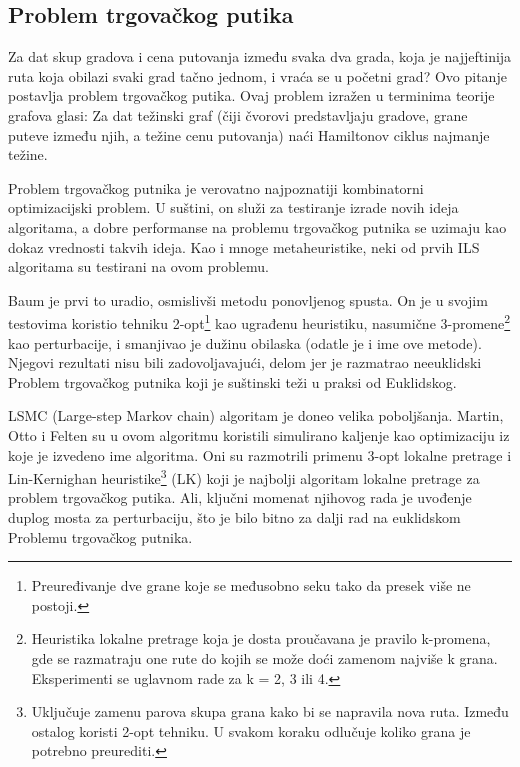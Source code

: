 \documentclass[a4paper]{article}
\begin{document}
\subsection{Problem trgovačkog putika}
Za dat skup gradova i cena putovanja između svaka dva grada, koja je najjeftinija ruta koja obilazi svaki grad tačno jednom, i vraća se u početni grad? Ovo pitanje postavlja problem trgovačkog putika. Ovaj problem izražen u terminima teorije grafova glasi: Za dat težinski graf (čiji čvorovi predstavljaju gradove, grane puteve između njih, a težine cenu putovanja) naći Hamiltonov ciklus najmanje težine.

Problem trgovačkog putnika je verovatno najpoznatiji kombinatorni optimizacijski problem. U suštini, on služi za testiranje izrade novih ideja algoritama, a dobre performanse na problemu trgovačkog putnika se uzimaju kao dokaz vrednosti takvih ideja. Kao i mnoge metaheuristike, neki od prvih ILS algoritama su testirani na ovom problemu. 

Baum je prvi to uradio, osmislivši metodu ponovljenog spusta. On je u svojim testovima koristio tehniku 2-opt\footnote{Preuređivanje dve grane koje se međusobno seku tako da presek više ne postoji.} kao ugrađenu heuristiku, nasumične 3-promene\footnote{Heuristika lokalne pretrage koja je dosta proučavana je pravilo k-promena, gde se razmatraju one rute do kojih se može doći zamenom najviše k grana. Eksperimenti se uglavnom rade za k = 2, 3 ili 4.} kao perturbacije, i smanjivao je dužinu obilaska (odatle je i ime ove metode). Njegovi rezultati nisu bili zadovoljavajući, delom jer je razmatrao neeuklidski Problem trgovačkog putnika koji je suštinski teži u praksi od Euklidskog.

LSMC (Large-step Markov chain) algoritam je doneo velika poboljšanja. Martin, Otto i Felten su u ovom algoritmu koristili simulirano kaljenje kao optimizaciju iz koje je izvedeno ime algoritma. Oni su razmotrili primenu 3-opt lokalne pretrage i Lin-Kernighan heuristike\footnote{Uključuje zamenu parova skupa grana kako bi se napravila nova ruta. Između ostalog koristi 2-opt tehniku. U svakom koraku odlučuje koliko grana je potrebno preurediti.} (LK) koji je najbolji algoritam lokalne pretrage za problem trgovačkog putika. Ali, ključni momenat njihovog rada je uvođenje duplog mosta za perturbaciju, što je bilo bitno za dalji rad na euklidskom Problemu trgovačkog putnika.
\end{document}
